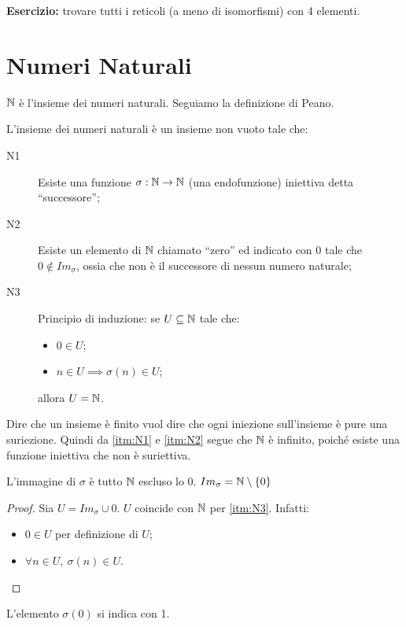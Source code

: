 \textbf{Esercizio:} trovare tutti i reticoli (a meno di isomorfismi) con 4 elementi.

\vspace{5cm}

\section{Numeri Naturali}

$\mathbb{N}$ \`e l'insieme dei numeri naturali. Seguiamo la definizione di Peano.
\begin{defn}
L'insieme dei numeri naturali \`e un insieme non vuoto tale che:
\begin{description}
  \item[N1\label{itm:N1}] Esiste una funzione $\sigma : \mathbb{N} \to \mathbb{N}$ (una endofunzione) iniettiva detta ``successore'';
  \item[N2\label{itm:N2}] Esiste un elemento di $\mathbb{N}$ chiamato ``zero'' ed indicato con 0 tale che $0 \notin Im_{\sigma}$, ossia che non \`e il successore di nessun numero naturale;
  \item[N3\label{itm:N3}] Principio di induzione: se $U \subseteq \mathbb{N}$ tale che:
  \begin{itemize}
    \item $0 \in U$;
    \item $n \in U \implies \sigma(n) \in U$;
  \end{itemize}
  allora $U = \mathbb{N}$.
\end{description}
\end{defn}
Dire che un insieme \`e finito vuol dire che ogni iniezione sull'insieme \`e pure una suriezione. Quindi da \ref{itm:N1} e \ref{itm:N2} segue che $\mathbb{N}$ \`e infinito, poich\'e esiste una funzione iniettiva che non \`e suriettiva.
\begin{prop}
L'immagine di $\sigma$ \`e tutto $\mathbb{N}$ escluso lo 0. $Im_{\sigma} = \mathbb{N} \setminus \{ 0 \}$
\end{prop}
\begin{proof}
Sia $U = Im_{\sigma} \cup 0$. $U$ coincide con $\mathbb{N}$ per \ref{itm:N3}. Infatti:
\begin{itemize}
  \item $0 \in U$ per definizione di $U$;
  \item $\forall n \in U, \ \sigma(n) \in U$.
\end{itemize}
\end{proof}
L'elemento $\sigma(0)$ si indica con 1.

